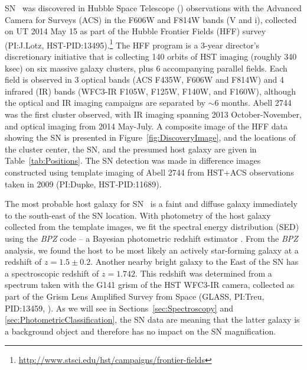 SN \tomas\ was discovered in Hubble Space Telescope (\HST) observations
with the Advanced Camera for Surveys (ACS) in the F606W and F814W
bands (V and i), collected on UT 2014 May 15 as part of the Hubble
Frontier Fields (HFF) survey (PI:J.Lotz,
HST-PID:13495).\footnote{\url{http://www.stsci.edu/hst/campaigns/frontier-fields}}
The HFF program is a 3-year director's discretionary initiative that
is collecting 140 orbits of HST imaging (roughly 340 ksec) on six
massive galaxy clusters, plus 6 accompanying parallel fields.  Each
field is observed in 3 optical bands (ACS F435W, F606W and F814W) and
4 infrared (IR) bands (WFC3-IR F105W, F125W, F140W, and F160W),
although the optical and IR imaging campaigns are separated by $\sim$6
months. Abell 2744 was the first cluster observed, with IR imaging
spanning 2013 October-November, and optical imaging from 2014
May-July.  A composite image of the HFF data showing the SN is
presented in Figure~\ref{fig:DiscoveryImage}, and the
locations of the cluster center, the SN, and the presumed host galaxy
are given in Table~\ref{tab:Positions}.  The SN detection was made in
difference images constructed using template imaging of Abell 2744
from HST+ACS observations taken in 2009 (PI:Dupke, HST-PID:11689).






The most probable host galaxy for SN \tomas\ is a faint and diffuse
galaxy immediately to the south-east of the SN location.  With
photometry of the host galaxy collected from the template images, we
fit the spectral energy distribution (SED) using the {\it BPZ} code --
a Bayesian photometric redshift estimator \citep{Benitez:2000}. 
From the {\it BPZ} analysis, we found the host to be most likely an
actively star-forming galaxy at a redshift of
$z=1.5\pm0.2$.    Another nearby bright galaxy to the East of the SN has a
spectroscopic redshift of $z=1.742$.  This redshift was determined
from a spectrum taken with the G141 grism of the HST WFC3-IR camera,
collected as part of the Grism Lens Amplified Survey from Space
(GLASS, PI:Treu, PID:13459, \citealt{Treu:2015}). As we will see in
Sections~\ref{sec:Spectroscopy}
and \ref{sec:PhotometricClassification}, the SN data are  meaning that the latter galaxy is a background object and
therefore has no impact on the SN magnification.

